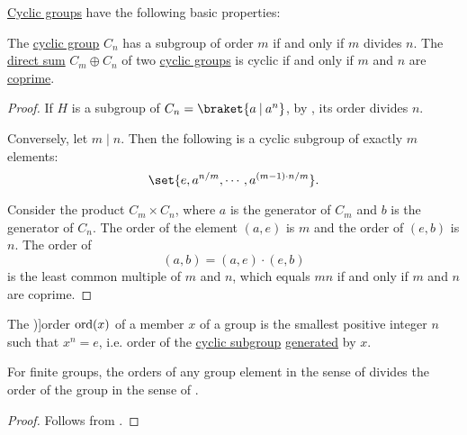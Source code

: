 \begin{proposition}\label{thm:def:cyclic_group}
  \hyperref[def:cyclic_group]{Cyclic groups} have the following basic properties:
  \begin{thmenum}
     The \hyperref[def:cyclic_group]{cyclic group} \( C_n \) has a subgroup of order \( m \) if and only if \( m \) divides \( n \).
     The \hyperref[def:semimodule_direct_sum]{direct sum} \( C_m \oplus C_n \) of two \hyperref[def:cyclic_group]{cyclic groups} is cyclic if and only if \( m \) and \( n \) are \hyperref[def:coprime_elements]{coprime}.
  \end{thmenum}
\end{proposition}
\begin{proof}
  \SufficiencySubProof* If \( H \) is a subgroup of \( C_n = \braket{ a \given a^n } \), by , its order divides \( n \).

  \NecessitySubProof* Conversely, let \( m \mid n \). Then the following is a cyclic subgroup of exactly \( m \) elements:
  \begin{equation*}
    \set{ e, a^{n / m}, \cdots, a^{(m - 1) \cdot n / m} }.
  \end{equation*}

   Consider the product \( C_m \times C_n \), where \( a \) is the generator of \( C_m \) and \( b \) is the generator of \( C_n \). The order of the element \( (a, e) \) is \( m \) and the order of \( (e, b) \) is \( n \). The order of
  \begin{equation*}
    (a, b) = (a, e) \cdot (e, b)
  \end{equation*}
  is the least common multiple of \( m \) and \( n \), which equals \( mn \) if and only if \( m \) and \( n \) are coprime.
\end{proof}

\begin{definition}\label{def:group_element_order}
  The \term[ru=степень (\cite[sec. 2.10]{Тыртышников2007})]{order} \( \operatorname{ord}(x) \) of a member \( x \) of a group is the smallest positive integer \( n \) such that \( x^n = e \), i.e. order of the \hyperref[def:cyclic_group]{cyclic subgroup} \hyperref[def:group/submodel]{generated} by \( x \).
\end{definition}

\begin{proposition}\label{thm:def:group_element_order}
  For finite groups, the orders of any group element in the sense of  divides the order of the group in the sense of .
\end{proposition}
\begin{proof}
  Follows from .
\end{proof}
